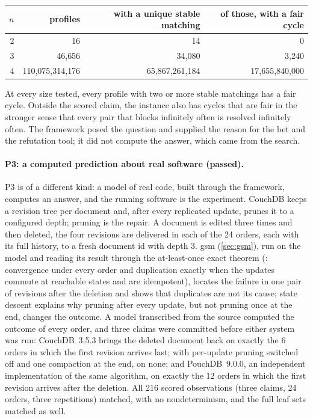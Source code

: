 \begin{center}\small
\begin{tabular}{@{}rrrr@{}}
\toprule
$n$ & profiles & with a unique stable matching & of those, with a fair cycle \\
\midrule
2 & 16 & 14 & 0 \\
3 & 46{,}656 & 34{,}080 & 3{,}240 \\
4 & 110{,}075{,}314{,}176 & 65{,}867{,}261{,}184 & 17{,}655{,}840{,}000 \\
\bottomrule
\end{tabular}
\end{center}

\noindent
At every size tested, every profile with two or more stable matchings has a fair cycle. Outside the
scored claim, the instance also has cycles that are fair in the stronger sense that every pair that
blocks infinitely often is resolved infinitely often. The framework posed the question and supplied the
reason for the bet and the refutation tool; it did not compute the answer, which came from the search.

\paragraph{P3: a computed prediction about real software (passed).}
P3 is of a different kind: a model of real code, built through the framework, computes an answer, and
the running software is the experiment. CouchDB keeps a revision tree per document and, after every
replicated update, prunes it to a configured depth; pruning is the repair. A document is edited three
times and then deleted, the four revisions are delivered in each of the 24 orders, each with its full
history, to a fresh document id with depth 3. gsm (\cref{sec:gsm}), run on the model and reading its
result through the at-least-once exact theorem (: convergence under every order and
duplication exactly when the updates commute at reachable states and are idempotent), locates the
failure in one pair of revisions after the deletion and shows that duplicates are not its cause;
state descent explains why
pruning after every update, but not pruning once at the end, changes the outcome. A model transcribed
from the source computed the outcome of every order, and three claims were committed before either
system was run: CouchDB~3.5.3 brings the deleted document back on exactly the 6 orders in which the
first revision arrives last; with per-update pruning switched off and one compaction at the end, on
none; and PouchDB~9.0.0, an independent implementation of the same algorithm, on exactly the 12 orders
in which the first revision arrives after the deletion. All 216 scored observations (three claims, 24
orders, three repetitions) matched, with no nondeterminism, and the full leaf sets matched as well.

